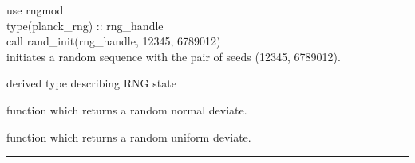 \begin{example}
{
use rngmod \\
type(planck\_rng) :: rng\_handle \\
call rand\_init(rng\_handle, 12345, 6789012)  \\
}
{
initiates a random sequence with the pair of seeds (12345, 6789012).
}
\end{example}

\begin{related}
  \begin{sulist}{} %
  \item[\htmlref{planck\_rng}{sub:planck_rng}] derived type describing RNG state
  \item[\htmlref{rand\_gauss}{sub:rand_gauss}] function which returns a  random normal deviate.
  \item[\htmlref{rand\_uni}{sub:rand_uni}] function which returns a random uniform deviate.
  \end{sulist}
\end{related}

\rule{\hsize}{2mm}

\newpage
